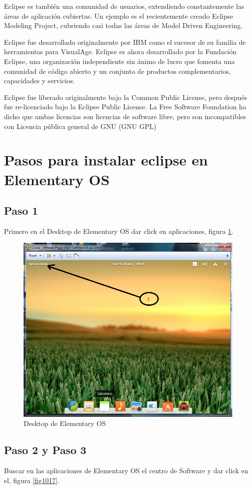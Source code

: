\documentclass[12pt, twoside]{report}
\begin{document}
Eclipse es también una comunidad de usuarios, extendiendo constantemente las áreas de aplicación cubiertas. Un ejemplo es el recientemente creado Eclipse Modeling Project, cubriendo casi todas las áreas de Model Driven Engineering.

Eclipse fue desarrollado originalmente por IBM como el sucesor de su familia de herramientas para VisualAge. Eclipse es ahora desarrollado por la Fundación Eclipse, una organización independiente sin ánimo de lucro que fomenta una comunidad de código abierto y un conjunto de productos complementarios, capacidades y servicios.

Eclipse fue liberado originalmente bajo la Common Public License, pero después fue re-licenciado bajo la Eclipse Public License. La Free Software Foundation ha dicho que ambas licencias son licencias de software libre, pero son incompatibles con Licencia pública general de GNU (GNU GPL)

\section{Pasos para instalar eclipse en Elementary OS}

\subsection{Paso 1}
Primero en el Desktop de Elementary OS dar click en aplicaciones, figura \ref{fig1016}.

\begin{figure}
	\centering
	\includegraphics[width=0.5\linewidth]{Eclipse1.png}
	\caption{Desktop de Elementary OS}
	\label{fig1016}
\end{figure}


\subsection{Paso 2 y Paso 3}

Buscar en las aplicaciones de Elementary OS el centro de Software y dar click en el, figura \ref{fig1017}.
\end{document}
